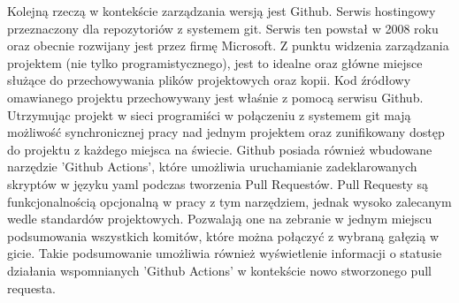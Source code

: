 Kolejną rzeczą w kontekście zarządzania wersją jest Github. Serwis hostingowy przeznaczony dla repozytoriów z systemem git. Serwis ten powstał w 2008 roku oraz obecnie rozwijany jest przez firmę Microsoft. \cite{GithubWiki} Z punktu widzenia zarządzania projektem (nie tylko programistycznego), jest to idealne oraz główne miejsce służące do przechowywania plików projektowych oraz kopii. Kod źródłowy omawianego projektu przechowywany jest właśnie z pomocą serwisu Github. Utrzymując projekt w sieci programiści w połączeniu z systemem git mają możliwość synchronicznej pracy nad jednym projektem oraz zunifikowany dostęp do projektu z każdego miejsca na świecie. Github posiada również wbudowane narzędzie 'Github Actions', które umożliwia uruchamianie zadeklarowanych skryptów w języku yaml podczas tworzenia Pull Requestów. Pull Requesty są funkcjonalnością opcjonalną w pracy z tym narzędziem, jednak wysoko zalecanym wedle standardów projektowych. Pozwalają one na zebranie w jednym miejscu podsumowania wszystkich komitów, które można połączyć z wybraną gałęzią w gicie. Takie podsumowanie umożliwia również wyświetlenie informacji o statusie działania wspomnianych 'Github Actions' w kontekście nowo stworzonego pull requesta.